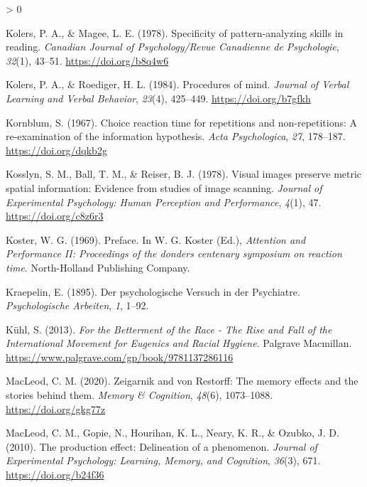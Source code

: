 \documentclass[
  oneside,
  12pt]{crumpbook}
\newlength{\cslhangindent}
\newenvironment{CSLReferences}[2] %
 {%
  \setlength{\parindent}{0pt}
  \ifodd #1 \everypar{\setlength{\hangindent}{\cslhangindent}}\ignorespaces\fi
  \ifnum #2 > 0
  \setlength{\parskip}{#2\baselineskip}
  \fi
 }%
 {}
\begin{document}
\begin{CSLReferences}{1}{0}
\leavevmode\hypertarget{ref-kolersSpecificityPatternanalyzingSkills1978}{}%
Kolers, P. A., \& Magee, L. E. (1978). Specificity of pattern-analyzing skills in reading. \emph{Canadian Journal of Psychology/Revue Canadienne de Psychologie}, \emph{32}(1), 43--51. \url{https://doi.org/b8q4w6}

\leavevmode\hypertarget{ref-kolersProceduresMind1984}{}%
Kolers, P. A., \& Roediger, H. L. (1984). Procedures of mind. \emph{Journal of Verbal Learning and Verbal Behavior}, \emph{23}(4), 425--449. \url{https://doi.org/b7gfkh}

\leavevmode\hypertarget{ref-kornblumChoiceReactionTime1967}{}%
Kornblum, S. (1967). Choice reaction time for repetitions and non-repetitions: {A} re-examination of the information hypothesis. \emph{Acta Psychologica}, \emph{27}, 178--187. \url{https://doi.org/dqkb2g}

\leavevmode\hypertarget{ref-kosslynVisualImagesPreserve1978}{}%
Kosslyn, S. M., Ball, T. M., \& Reiser, B. J. (1978). Visual images preserve metric spatial information: Evidence from studies of image scanning. \emph{Journal of Experimental Psychology: Human Perception and Performance}, \emph{4}(1), 47. \url{https://doi.org/c8z6r3}

\leavevmode\hypertarget{ref-kosterPreface1969}{}%
Koster, W. G. (1969). Preface. In W. G. Koster (Ed.), \emph{Attention and {Performance II}: Proceedings of the donders centenary symposium on reaction time}. {North-Holland Publishing Company}.

\leavevmode\hypertarget{ref-kraepelinPsychologischeVersuchPsychiatre1895}{}%
Kraepelin, E. (1895). Der psychologische {Versuch} in der {Psychiatre}. \emph{Psychologische Arbeiten}, \emph{1}, 1--92.

\leavevmode\hypertarget{ref-kuhlBettermentRaceRise2013}{}%
Kühl, S. (2013). \emph{For the {Betterment} of the {Race} - {The Rise} and {Fall} of the {International Movement} for {Eugenics} and {Racial Hygiene}}. {Palgrave Macmillan}. \url{https://www.palgrave.com/gp/book/9781137286116}

\leavevmode\hypertarget{ref-macleodZeigarnikRestorffMemory2020}{}%
MacLeod, C. M. (2020). Zeigarnik and von {Restorff}: {The} memory effects and the stories behind them. \emph{Memory \& Cognition}, \emph{48}(6), 1073--1088. \url{https://doi.org/gkg77z}

\leavevmode\hypertarget{ref-macleodProductionEffectDelineation2010}{}%
MacLeod, C. M., Gopie, N., Hourihan, K. L., Neary, K. R., \& Ozubko, J. D. (2010). The production effect: Delineation of a phenomenon. \emph{Journal of Experimental Psychology: Learning, Memory, and Cognition}, \emph{36}(3), 671. \url{https://doi.org/b24f36}


\end{CSLReferences}
\end{document}
